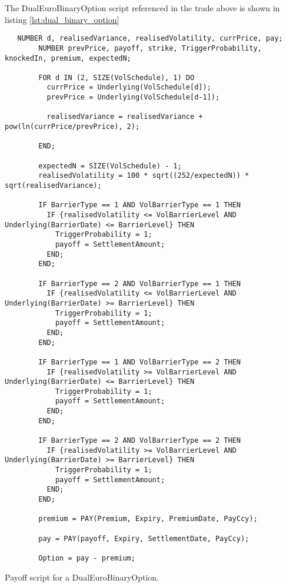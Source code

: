 The DualEuroBinaryOption script referenced in the trade above is shown in listing
\ref{lst:dual_binary_option}

\begin{listing}[hbt]
\begin{verbatim}
   NUMBER d, realisedVariance, realisedVolatility, currPrice, pay;
        NUMBER prevPrice, payoff, strike, TriggerProbability, knockedIn, premium, expectedN;

        FOR d IN (2, SIZE(VolSchedule), 1) DO
          currPrice = Underlying(VolSchedule[d]);
          prevPrice = Underlying(VolSchedule[d-1]);

          realisedVariance = realisedVariance + pow(ln(currPrice/prevPrice), 2);

        END;

        expectedN = SIZE(VolSchedule) - 1;
        realisedVolatility = 100 * sqrt((252/expectedN)) * sqrt(realisedVariance);

        IF BarrierType == 1 AND VolBarrierType == 1 THEN
          IF {realisedVolatility <= VolBarrierLevel AND Underlying(BarrierDate) <= BarrierLevel} THEN
            TriggerProbability = 1;
            payoff = SettlementAmount;
          END;
        END;

        IF BarrierType == 2 AND VolBarrierType == 1 THEN
          IF {realisedVolatility <= VolBarrierLevel AND Underlying(BarrierDate) >= BarrierLevel} THEN
            TriggerProbability = 1;
            payoff = SettlementAmount;
          END;
        END;

        IF BarrierType == 1 AND VolBarrierType == 2 THEN
          IF {realisedVolatility >= VolBarrierLevel AND Underlying(BarrierDate) <= BarrierLevel} THEN
            TriggerProbability = 1;
            payoff = SettlementAmount;
          END;
        END;

        IF BarrierType == 2 AND VolBarrierType == 2 THEN
          IF {realisedVolatility >= VolBarrierLevel AND Underlying(BarrierDate) >= BarrierLevel} THEN
            TriggerProbability = 1;
            payoff = SettlementAmount;
          END;
        END;

        premium = PAY(Premium, Expiry, PremiumDate, PayCcy);

        pay = PAY(payoff, Expiry, SettlementDate, PayCcy);

        Option = pay - premium;
\end{verbatim}
\caption{Payoff script for a DualEuroBinaryOption.}
\label{lst:dual_binary_option}
\end{listing}

